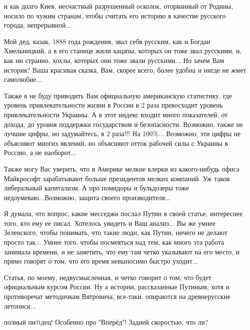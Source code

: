 \begin{itemize}
и как долго Киев, несчастный разрушенный осколок, оторванный от Родины, носило
по чужим странам, чтобы считать его историю в качестве русского города,
непрерывной...

Мой дед, казак, 1888 года рождения, звал себя русским, как и Богдан
Хмельницкий, а в его станице жили кацапы, которых он тоже звал русскими, и, как
ни странно, хохлы, которых они тоже звали русскими... Но зачем Вам история?
Ваша красивая сказка, Вам, скорее всего, более удобна и нигде не жмет
самолюбие...

Также я не буду приводить Вам официальную американскую статистику, где уровень
привлекательности жизни в России в 2 раза превосходит уровень привлекательности
Украины. А в этот индекс входит много показателей, от дохода, до уровня
поддержки государством и безопасности. Возможно, также не лучшие цифры, но
задумайтесь, в 2 раза!!! На 100\%... Возможно, эти цифры не объясняют многих
явлений, но объясняют отток рабочей силы с Украины в Россию, а не наоборот...

Также могу Вас уверить, что в Америке мелкие клерки из какого-нибудь офиса
Майкрософт зарабатывают больше президентов мелких компаний. Уж таков
либеральный капитализм. А про помидоры и бульдозеры тоже недоумеваю...Возможно,
защита своего производителя...

Я думала, что вопрос, какие месседжи послал Путин в своей статье, интереснее
того, кто ему ее писал. Хотелось увидеть и Ваш анализ... Вы же умнее
Зеленского, чтобы понимать, что такие люди, как Путин, ничего не делают просто
так... Умнее того, чтобы посмеяться над тем, как много эта работа занимала
времени, и не заметить, что ему там четко указывают на его место, и прямо
говорят о том, что его время невыносимо быстро уходит... 

Статья, по моему, недвусмысленная, и четко говорит о том, что будет официальным
курсом России. Ну а истории, рассказанные Путиным, хотя и противоречат
методичкам Вятровича, все-таки, опираются на древнерусские летописи...

 
полный пи@дец! Особенно про "Вперёд"! Задней скоростью, что ли?

 

\end{itemize}
